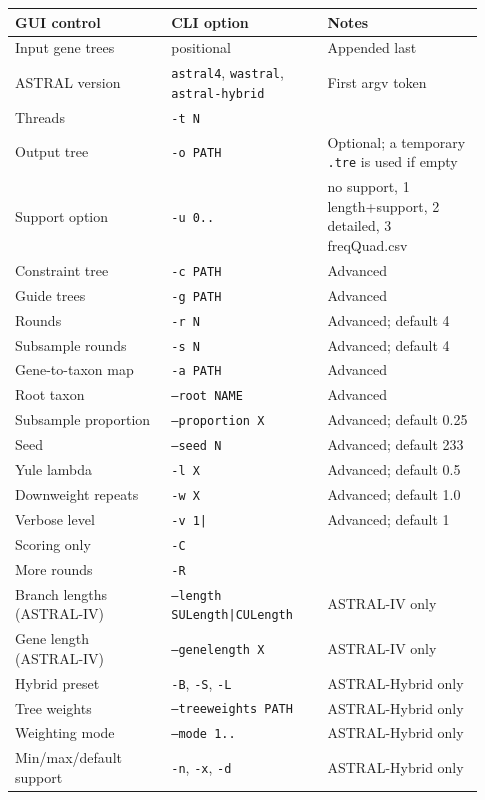 \documentclass[11pt]{report}
\begin{document}
{\footnotesize
\begin{longtable}{@{}>{\raggedright\arraybackslash}p{0.31\linewidth}>{\raggedright\arraybackslash}p{0.31\linewidth}>{\raggedright\arraybackslash}p{0.31\linewidth}@{}}
\toprule
GUI control & CLI option & Notes \\
\midrule
\endhead
Input gene trees & positional & Appended last \\
ASTRAL version & \texttt{astral4}, \texttt{wastral}, \texttt{astral-hybrid} & First argv token \\
Threads & \texttt{-t N} &  \\
Output tree & \texttt{-o PATH} & Optional; a temporary \texttt{.\allowbreak tre} is used if empty \\
Support option & \texttt{-u 0.\allowbreak .\allowbreak 3} & 0 no support, 1 length+support, 2 detailed, 3 freqQuad.csv \\
Constraint tree & \texttt{-c PATH} & Advanced \\
Guide trees & \texttt{-g PATH} & Advanced \\
Rounds & \texttt{-r N} & Advanced; default 4 \\
Subsample rounds & \texttt{-s N} & Advanced; default 4 \\
Gene-to-taxon map & \texttt{-a PATH} & Advanced \\
Root taxon & \texttt{--root NAME} & Advanced \\
Subsample proportion & \texttt{--proportion X} & Advanced; default 0.25 \\
Seed & \texttt{--seed N} & Advanced; default 233 \\
Yule lambda & \texttt{-l X} & Advanced; default 0.5 \\
Downweight repeats & \texttt{-w X} & Advanced; default 1.0 \\
Verbose level & \texttt{-v 1|\allowbreak 2} & Advanced; default 1 \\
Scoring only & \texttt{-C} &  \\
More rounds & \texttt{-R} &  \\
Branch lengths (ASTRAL-IV) & \texttt{--length SULength|\allowbreak CULength} & ASTRAL-IV only \\
Gene length (ASTRAL-IV) & \texttt{--genelength X} & ASTRAL-IV only \\
Hybrid preset & \texttt{-B}, \texttt{-S}, \texttt{-L} & ASTRAL-Hybrid only \\
Tree weights & \texttt{--treeweights PATH} & ASTRAL-Hybrid only \\
Weighting mode & \texttt{--mode 1.\allowbreak .\allowbreak 4} & ASTRAL-Hybrid only \\
Min/max/default support & \texttt{-n}, \texttt{-x}, \texttt{-d} & ASTRAL-Hybrid only \\
\bottomrule
\end{longtable}
}
\end{document}
